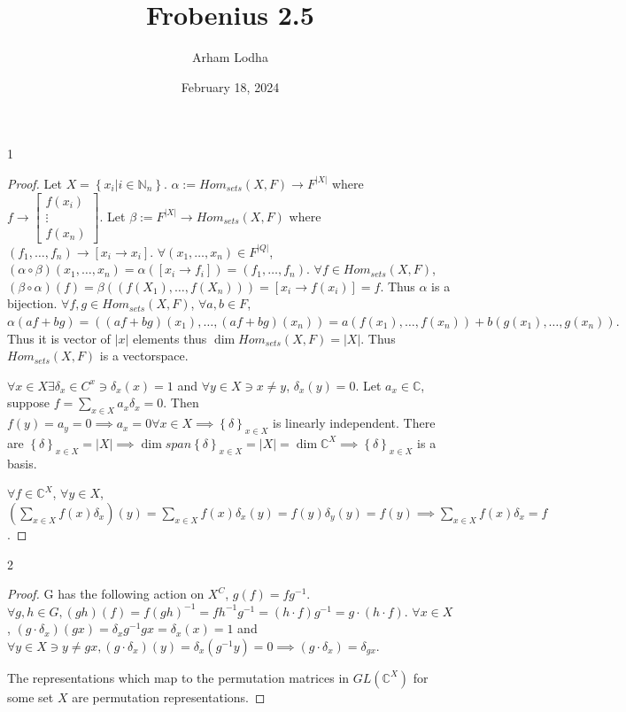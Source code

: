 \documentclass{article}
\newcommand{\C}{\mathbb{C}}
\newcommand{\N}{\mathbb{N}}
\begin{document}
\title{Frobenius 2.5}
\author{Arham Lodha}%
\date{February 18, 2024}%
\maketitle

\begin{PROB}{1}\label{Problem 1.}
    
\end{PROB}
\begin{proof}
    Let $X = \left\{ x_i | i \in \N_n \right\}$. $\alpha := Hom_{sets}(X, F) \to F^{|X|}$ where $f \to \begin{bmatrix}
        f(x_i) \\ \vdots \\ f(x_n)
    \end{bmatrix}$. Let $\beta := F^{|X|} \to Hom_{sets}(X, F)$ where $(f_1, \dots, f_n) \to [x_i \to x_i]$. $\forall (x_1, \dots, x_n) \in F^{|Q|}$, $(\alpha \circ \beta)(x_1, \dots, x_n) = \alpha([x_i \to f_i]) = (f_1, \dots, f_n)$. $\forall f \in Hom_{sets}(X, F)$, $(\beta \circ \alpha)(f) = \beta((f(X_1), \dots, f(X_n))) = [x_i \to f(x_i)] = f$. Thus $\alpha$ is a bijection. $\forall f, g \in Hom_{sets}(X, F)$, $\forall a, b \in F$, $\alpha(af + bg) = ((af + bg)(x_1), \dots, (af + bg)(x_n)) = a(f(x_1), \dots, f(x_n)) + b(g(x_1), \dots, g(x_n)).$ Thus it is vector of $|x|$ elements thus $\dim Hom_{sets}(X,F) = |X|$. Thus $Hom_{sets}(X, F)$ is a vectorspace. 
    
    $\forall x \in X \exists \delta_{x} \in C^{x} \ni \delta_x(x) = 1$ and $\forall y \in X \ni x \neq y$, $\delta_x(y) = 0$. Let $a_x \in \C$, suppose $f = \sum_{x \in X} a_x \delta_x = 0$. Then $f(y) = a_y = 0  \implies a_x = 0 \forall x\in X \implies \left\{ \delta \right\}_{x \in X}$ is linearly independent. There are $\left\{ \delta \right\}_{x \in X} = |X| \implies \dim span \left\{ \delta \right\}_{x \in X} = |X| = \dim \C^{X} \implies \left\{ \delta \right\}_{x \in X}$ is a basis.
    
    $\forall f \in \C^{X}$, $\forall y \in X$, $(\sum_{x \in X} f(x) \delta_x)(y) = \sum_{x \in X} f(x) \delta_x(y) = f(y)\delta_y(y) = f(y) \implies \sum_{x \in X} f(x) \delta_x = f$.  
\end{proof}

\bigskip

\begin{PROB}{2}\label{Problem 2.}
        
\end{PROB}
\begin{proof}
    G has the following action on $X^C$, $g(f) = fg^{-1}$. $\forall g, h \in G, (gh)(f) = f(gh)^{-1} = fh^{-1}g^{-1} = (h \cdot f)g^{-1} = g \cdot (h \cdot f)$. $\forall x \in X$, $(g \cdot \delta_x)(gx) = \delta_x g^{-1} g x = \delta_x(x) = 1$ and $\forall y \in X \ni y \neq gx, (g \cdot \delta_x)(y) = \delta_x(g^{-1} y) = 0 \implies (g \cdot \delta_x) = \delta_{gx}$.
    
    The representations which map to the permutation matrices in $GL(\C^X)$ for some set $X$ are permutation representations.  
\end{proof}
\end{document}
